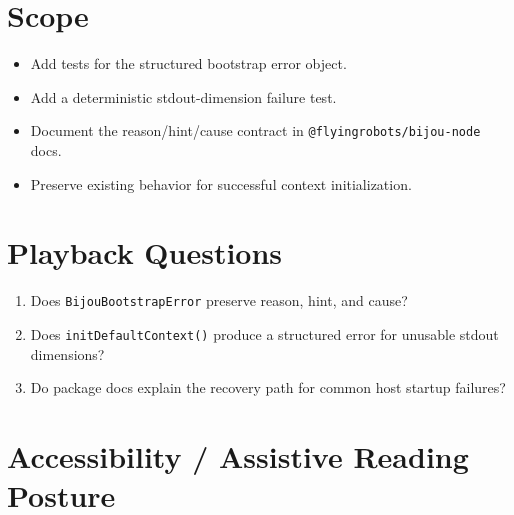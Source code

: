 \section{Scope}\label{record-167-scope}

\begin{itemize}
\tightlist
\item
  Add tests for the structured bootstrap error object.
\item
  Add a deterministic stdout-dimension failure test.
\item
  Document the reason/hint/cause contract in \texttt{@\allowbreak{}f\allowbreak{}l\allowbreak{}y\allowbreak{}i\allowbreak{}n\allowbreak{}g\allowbreak{}r\allowbreak{}o\allowbreak{}b\allowbreak{}o\allowbreak{}t\allowbreak{}s\allowbreak{}/\allowbreak{}b\allowbreak{}i\allowbreak{}j\allowbreak{}o\allowbreak{}u\allowbreak{}-\allowbreak{}n\allowbreak{}o\allowbreak{}d\allowbreak{}e} docs.
\item
  Preserve existing behavior for successful context initialization.
\end{itemize}

\section{Playback Questions}\label{record-167-playback-questions}

\begin{enumerate}
\def\labelenumi{\arabic{enumi}.}
\tightlist
\item
  Does \texttt{B\allowbreak{}i\allowbreak{}j\allowbreak{}o\allowbreak{}u\allowbreak{}B\allowbreak{}o\allowbreak{}o\allowbreak{}t\allowbreak{}s\allowbreak{}t\allowbreak{}r\allowbreak{}a\allowbreak{}p\allowbreak{}E\allowbreak{}r\allowbreak{}r\allowbreak{}o\allowbreak{}r} preserve reason, hint, and cause?
\item
  Does \texttt{i\allowbreak{}n\allowbreak{}i\allowbreak{}t\allowbreak{}D\allowbreak{}e\allowbreak{}f\allowbreak{}a\allowbreak{}u\allowbreak{}l\allowbreak{}t\allowbreak{}C\allowbreak{}o\allowbreak{}n\allowbreak{}t\allowbreak{}e\allowbreak{}x\allowbreak{}t\allowbreak{}(\allowbreak{})} produce a structured error for unusable stdout dimensions?
\item
  Do package docs explain the recovery path for common host startup failures?
\end{enumerate}

\section{Accessibility / Assistive Reading Posture}\label{record-167-accessibility-assistive-reading-posture}

